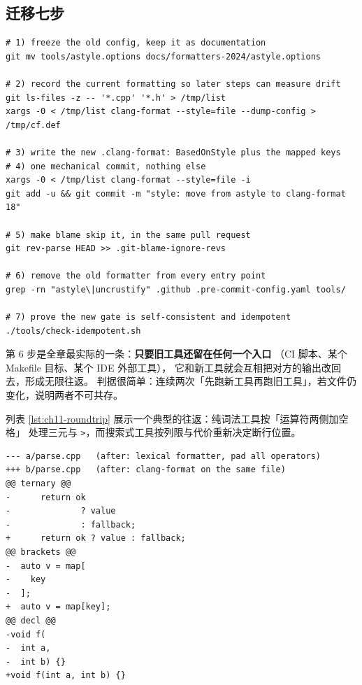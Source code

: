\documentclass[12pt,a4paper,fontset=fandol]{ctexbook}
\newcommand{\Lib}[1]{\textbf{\texttt{#1}}}
\newcommand{\Fmt}{\Lib{clang-format}}
\begin{document}
\subsection{迁移七步}\label{sec:ch11-s6-steps}

\begin{lstlisting}[style=shellstyle,caption={把旧工具换成 \Fmt\ 的操作顺序},label={lst:ch11-steps}]
# 1) freeze the old config, keep it as documentation
git mv tools/astyle.options docs/formatters-2024/astyle.options

# 2) record the current formatting so later steps can measure drift
git ls-files -z -- '*.cpp' '*.h' > /tmp/list
xargs -0 < /tmp/list clang-format --style=file --dump-config > /tmp/cf.def

# 3) write the new .clang-format: BasedOnStyle plus the mapped keys
# 4) one mechanical commit, nothing else
xargs -0 < /tmp/list clang-format --style=file -i
git add -u && git commit -m "style: move from astyle to clang-format 18"

# 5) make blame skip it, in the same pull request
git rev-parse HEAD >> .git-blame-ignore-revs

# 6) remove the old formatter from every entry point
grep -rn "astyle\|uncrustify" .github .pre-commit-config.yaml tools/

# 7) prove the new gate is self-consistent and idempotent
./tools/check-idempotent.sh
\end{lstlisting}

第 6 步是全章最实际的一条：\textbf{只要旧工具还留在任何一个入口}
（CI 脚本、某个 Makefile 目标、某个 IDE 外部工具），
它和新工具就会互相把对方的输出改回去，形成无限往返。
判据很简单：连续两次「先跑新工具再跑旧工具」，若文件仍变化，说明两者不可共存。

列表 \ref{lst:ch11-roundtrip} 展示一个典型的往返：纯词法工具按「运算符两侧加空格」
处理三元与 \texttt{>}，而搜索式工具按列限与代价重新决定断行位置。

\begin{lstlisting}[style=diffstyle,caption={同一文件在两种机制之间往返的结果},label={lst:ch11-roundtrip}]
--- a/parse.cpp   (after: lexical formatter, pad all operators)
+++ b/parse.cpp   (after: clang-format on the same file)
@@ ternary @@
-      return ok
-              ? value
-              : fallback;
+      return ok ? value : fallback;
@@ brackets @@
-  auto v = map[
-    key
-  ];
+  auto v = map[key];
@@ decl @@
-void f(
-  int a,
-  int b) {}
+void f(int a, int b) {}
\end{lstlisting}
\end{document}
